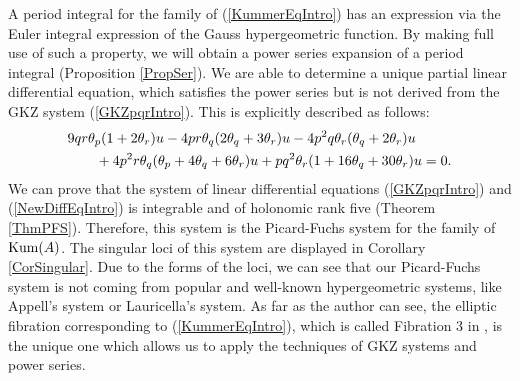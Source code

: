 \documentclass[10pt]{article}
\begin{document}
A period integral for the family of (\ref{KummerEqIntro}) has an expression via the Euler integral expression of the Gauss hypergeometric function.
By making full use of such a property,
we will obtain a power series expansion of a period integral (Proposition \ref{PropSer}).
We are able to determine a unique partial linear differential equation,
which satisfies the power series but is not derived from the GKZ system (\ref{GKZpqrIntro}).
This is explicitly described as follows:
\begin{align}\label{NewDiffEqIntro}
&9 q r \theta_p( 1+ 2 \theta_r) u 
-  4 p r \theta_q (2 \theta_q + 3 \theta_r)u 
-  4 p^2 q \theta_r (\theta_q + 2 \theta_r) u \notag \\
&\quad\quad +  4 p^2 r \theta_q (\theta_p + 4 \theta_q + 6 \theta_r) u 
+  p q^2 \theta_r (1+ 16 \theta_q  + 30 \theta_r)u =0.
\end{align}
We can prove that 
the system of linear differential equations (\ref{GKZpqrIntro}) and (\ref{NewDiffEqIntro}) is integrable and of holonomic rank five (Theorem \ref{ThmPFS}).
Therefore, this system is the Picard-Fuchs system for the family of ${\rm Kum}(A)$. 
The singular loci of this system are displayed in Corollary \ref{CorSingular}.
Due to the forms of the loci, we can see that our Picard-Fuchs system is not coming from popular and  well-known hypergeometric systems, like Appell's system or Lauricella's system.
As far as the author can see,
the elliptic fibration corresponding to (\ref{KummerEqIntro}),
which is called Fibration 3 in \cite{Kumar},
 is the unique one which allows us to apply the techniques of GKZ systems and power series.
\end{document}
